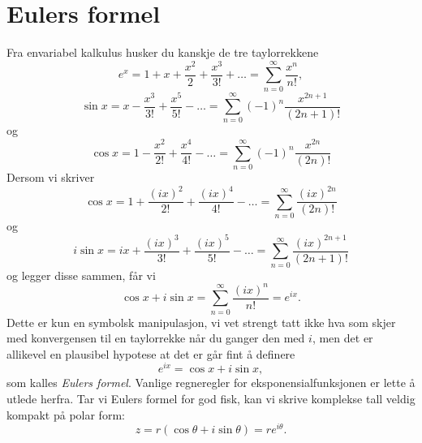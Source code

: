 \section*{Eulers formel}
Fra envariabel kalkulus husker du kanskje de tre taylorrekkene
\[
e^{x}=1+x+\frac{x^{2}}{2}+\frac{x^{3}}{3!}+\dots=\sum_{n=0}^{\infty}\frac{x^{n}}{n!}, 
\]
\[
\sin{x}=x-\frac{x^{3}}{3!}+\frac{x^{5}}{5!}-\dots=\sum_{n=0}^{\infty}(-1)^{n}\frac{x^{2n+1}}{(2n+1)!} 
\]
og
\[
\cos{x}=1-\frac{x^{2}}{2!}+\frac{x^{4}}{4!}-\dots=\sum_{n=0}^{\infty}(-1)^{n}\frac{x^{2n}}{(2n)!}
\]
Dersom vi skriver 
\[
\cos{x}=1+\frac{(ix)^{2}}{2!}+\frac{(ix)^{4}}{4!}-\dots=\sum_{n=0}^{\infty}\frac{(ix)^{2n}}{(2n)!}
\]
og 
\[
i\sin{x}=ix+\frac{(ix)^{3}}{3!}+\frac{(ix)^{5}}{5!}-\dots=\sum_{n=0}^{\infty}\frac{(ix)^{2n+1}}{(2n+1)!}
\]
og legger disse sammen, får vi 
\[
\cos x + i\sin x=\sum_{n=0}^{\infty}\frac{(ix)^{n}}{n!}=e^{ix}.
\]
Dette er kun en symbolsk manipulasjon, vi vet strengt tatt ikke hva som skjer med konvergensen til en taylorrekke når du ganger den med $i$, men det er allikevel en plausibel hypotese at det er går fint å definere
\[
e^{ix}=\cos x + i\sin x,
\]
som kalles \emph{Eulers formel}. Vanlige regneregler for eksponensialfunksjonen er lette å utlede herfra.
Tar vi Eulers formel for god fisk, kan vi skrive komplekse tall veldig kompakt på polar form:
\[
z=r(\cos \theta+i\sin \theta)=re^{i\theta}.
\]


